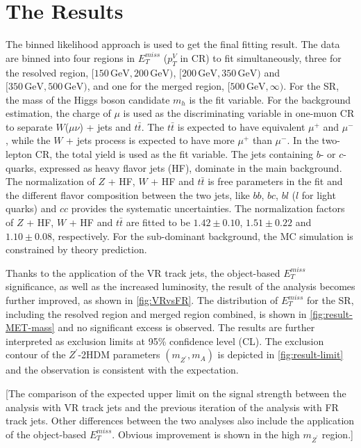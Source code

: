 \documentclass[class=NTHU_thesis, crop=false]{standalone}
\begin{document}
\chapter{The Results}
\label{chap:result}
The binned likelihood approach is used to get the final fitting result. The data are binned into four regions in $E^{miss}_T$ ($p^V_T$ in CR) to fit simultaneously, three for the resolved region, $[150\, \mathrm{GeV}, 200\, \mathrm{GeV})$, $[200\, \mathrm{GeV}, 350\, \mathrm{GeV})$ and $[350\, \mathrm{GeV}, 500\, \mathrm{GeV})$, and one for the merged region, $[500\, \mathrm{GeV}, \infty)$. For the SR, the mass of the Higgs boson candidate $m_h$ is the fit variable. For the background estimation, the charge of $\mu$ is used as the discriminating variable in one-muon CR to separate $W$($\mu\nu$) + jets and $t\bar{t}$. The $t\bar{t}$ is expected to have equivalent $\mu^+$ and $\mu^-$, while the $W$ + jets process is expected to have more $\mu^+$ than $\mu^-$. In the two-lepton CR, the total yield is used as the fit variable. The jets containing $b$- or $c$-quarks, expressed as heavy flavor jets (HF), dominate in the main background. The normalization of $Z$ + HF, $W$ + HF and $t\bar{t}$ is free parameters in the fit and the different flavor composition between the two jets, like $bb$, $bc$, $bl$ ($l$ for light quarks) and $cc$ provides the systematic uncertainties. The normalization factors of $Z$ + HF, $W$ + HF and $t\bar{t}$ are fitted to be $1.42 \pm 0.10$, $1.51 \pm 0.22$ and $1.10 \pm 0.08$, respectively. For the sub-dominant background, the MC simulation is constrained by theory prediction.

Thanks to the application of the VR track jets, the object-based $E^{miss}_T$ significance, as well as the increased luminosity, the result of the analysis becomes further improved, as shown in \cref{fig:VRvsFR}. The distribution of $E^{miss}_T$ for the SR, including the resolved region and merged region combined, is shown in \cref{fig:result-MET-mass} and no significant excess is observed. The results are further interpreted as exclusion limits at 95\% confidence level (CL). The exclusion contour of the $Z^\prime$-2HDM parameters $(m_{Z^\prime}, m_A)$ is depicted in \cref{fig:result-limit} and the observation is consistent with the expectation\cite{ATLAS-CONF-2018-039}.

[The comparison of the expected upper limit on the signal strength between the analysis with VR track jets and the previous iteration of the analysis with FR track jets. Other differences between the two analyses also include the application of the object-based $E^{miss}_T$. Obvious improvement is shown in the high $m_{Z^\prime}$ region.]
\end{document}
